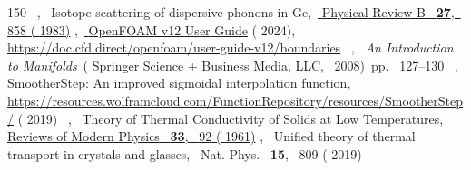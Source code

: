 \documentclass[
prb,
twocolumn,
superscriptaddress,
 amsmath,amssymb,
 aps,
longbibliography,
]{revtex4-2}
\begin{document}
\begin{thebibliography}{150}
   { {\ },\ } { {Isotope scattering of dispersive phonons in {Ge}},\ }\href {https://doi.org/10.1103/PhysRevB.27.858} { { {Physical Review B}\ }\textbf { {27}},\  {858} ( {1983})}
  \BibitemOpen
   { {},\ }\href {https://doc.cfd.direct/openfoam/user-guide-v12/index/} { {{OpenFOAM} v12 {User} {Guide}}} ( {2024}),\  {\url{https://doc.cfd.direct/openfoam/user-guide-v12/boundaries}}
  \BibitemOpen
   { {\ },\ }\href@noop {} {\emph { {An Introduction to Manifolds}}}\ ( {Springer Science + Business Media, LLC},\  {2008})\ pp.\  {127--130}
  \BibitemOpen
   { {~},\ }\href@noop {} { {{SmootherStep: An improved sigmoidal interpolation function}}},\  {\url{https://resources.wolframcloud.com/FunctionRepository/resources/SmootherStep/}} ( {2019})
  \BibitemOpen
   { {~},\ } { {Theory of {Thermal} {Conductivity} of {Solids} at {Low} {Temperatures}},\ }\href {https://doi.org/10.1103/RevModPhys.33.92} { { {Reviews of Modern Physics}\ }\textbf { {33}},\  {92} ( {1961})}
  \BibitemOpen
   { {},\ } { {{Unified theory of thermal transport in crystals and glasses}},\ }\href@noop {} { { {Nat. Phys.}\ }\textbf { {15}},\  {809} ( {2019})}

\end{thebibliography}
\end{document}

